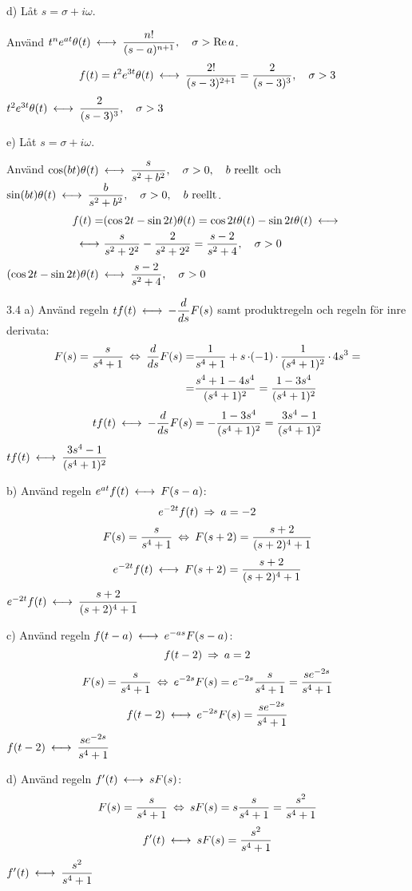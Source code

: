 \begin{task}{d)}
	Låt $s=\sigma+i\omega$.
	
	Använd $t^ne^{at}\theta(t)\llra \dfrac{n!}{(s-a)^{n+1}}\cond{\sigma > \Re a}$.
	\begin{align*}
	f(t)=
	t^2e^{3t}\theta(t)\llra
	\frac{2!}{(s-3)^{2+1}}=
	\frac{2}{(s-3)^3}\cond{\sigma > 3}
	\end{align*}
	\ans $t^2e^{3t}\theta(t)\llra\dfrac{2}{(s-3)^3}\cond{\sigma > 3}$
\end{task}

\begin{task}{e)}
	Låt $s=\sigma+i\omega$.
	
	Använd $\cos(bt)\theta(t)\llra \dfrac{s}{s^2+b^2}\cond{\sigma > 0}\cond{b\text{ reellt}}$ och \\
	$\sin(bt)\theta(t)\llra \dfrac{b}{s^2+b^2}\cond{\sigma > 0}\cond{b\text{ reellt}}$.
	\begin{align*}
	f(t)=&
	(\cos2t-\sin2t)\theta(t)=
	\cos2t\theta(t)-\sin2t\theta(t)\llra \\ \llra
	&\frac{s}{s^2+2^2}-\frac{2}{s^2+2^2}=
	\frac{s-2}{s^2+4}\cond{\sigma > 0}
	\end{align*}
	\ans $(\cos2t-\sin2t)\theta(t)\llra\dfrac{s-2}{s^2+4}\cond{\sigma > 0}$
\end{task}

\pagebreak
\begin{task}{3.4 a)}
	Använd regeln $tf(t) \llra -\dfrac{d}{ds}F(s)$ samt produktregeln och regeln för inre derivata:
	\begin{align*}
	F(s)=
	\frac{s}{s^4+1} \lra 
	\frac{d}{ds}F(s)=
	&\frac{1}{s^4+1}+s\*(-1)\*\frac{1}{(s^4+1)^2}\*4s^3= \\ =
	&\frac{s^4+1-4s^4}{(s^4+1)^2}=
	\frac{1-3s^4}{(s^4+1)^2}
	\end{align*}
	\[tf(t) \llra -\dfrac{d}{ds}F(s)=-\frac{1-3s^4}{(s^4+1)^2}=\frac{3s^4-1}{(s^4+1)^2}\]
	\ans $tf(t) \llra \dfrac{3s^4-1}{(s^4+1)^2}$
\end{task}

\begin{task}{b)}
	Använd regeln $e^{at}f(t) \llra F(s-a)$:
	\[e^{-2t}f(t) \ra a=-2\]
	\begin{align*}
	F(s)=
	\frac{s}{s^4+1} \lra 
	F(s+2)=
	\frac{s+2}{(s+2)^4+1}
	\end{align*}
	\[e^{-2t}f(t) \llra F(s+2)=\frac{s+2}{(s+2)^4+1}\]
	\ans $e^{-2t}f(t) \llra \dfrac{s+2}{(s+2)^4+1}$
\end{task}

\begin{task}{c)}
	Använd regeln $f(t-a) \llra e^{-as}F(s-a)$:
	\[f(t-2) \ra a=2\]
	\begin{align*}
	F(s)=
	\frac{s}{s^4+1} \lra 
	e^{-2s}F(s)=
	e^{-2s}\frac{s}{s^4+1}=
	\frac{se^{-2s}}{s^4+1}
	\end{align*}
	\[f(t-2) \llra e^{-2s}F(s)=\frac{se^{-2s}}{s^4+1}\]
	\ans $f(t-2) \llra \dfrac{se^{-2s}}{s^4+1}$
\end{task}

\begin{task}{d)}
	Använd regeln $f'(t) \llra sF(s)$:
	\begin{align*}
	F(s)=
	\frac{s}{s^4+1} \lra 
	sF(s)=
	s\frac{s}{s^4+1}=
	\frac{s^2}{s^4+1}
	\end{align*}
	\[f'(t) \llra sF(s)=\frac{s^2}{s^4+1}\]
	\ans $f'(t) \llra \dfrac{s^2}{s^4+1}$
\end{task}